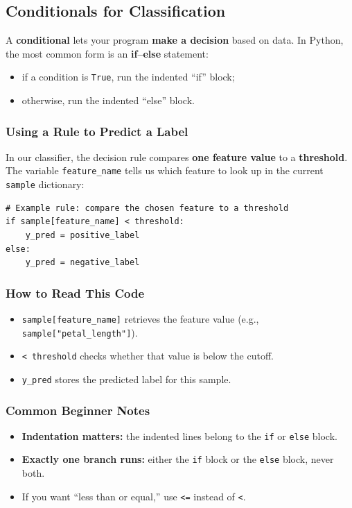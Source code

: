 \subsection{Conditionals for Classification}
\label{sec:ses3_conditionals}

A \textbf{conditional} lets your program \textbf{make a decision} based on data. In Python, the most common form is an \textbf{if--else} statement:
\begin{itemize}
  \item if a condition is \texttt{True}, run the indented ``if'' block;
  \item otherwise, run the indented ``else'' block.
\end{itemize}

\subsubsection{Using a Rule to Predict a Label}
In our classifier, the decision rule compares \textbf{one feature value} to a \textbf{threshold}. The variable \texttt{feature\_name} tells us which feature to look up in the current \texttt{sample} dictionary:

\begin{verbatim}
# Example rule: compare the chosen feature to a threshold
if sample[feature_name] < threshold:
    y_pred = positive_label
else:
    y_pred = negative_label
\end{verbatim}

\subsubsection{How to Read This Code}
\begin{itemize}
  \item \texttt{sample[feature\_name]} retrieves the feature value (e.g., \texttt{sample["petal\_length"]}).
  \item \texttt{< threshold} checks whether that value is below the cutoff.
  \item \texttt{y\_pred} stores the predicted label for this sample.
\end{itemize}

\subsubsection{Common Beginner Notes}
\begin{itemize}
  \item \textbf{Indentation matters:} the indented lines belong to the \texttt{if} or \texttt{else} block.
  \item \textbf{Exactly one branch runs:} either the \texttt{if} block or the \texttt{else} block, never both.
  \item If you want ``less than or equal,'' use \texttt{<=} instead of \texttt{<}.
\end{itemize}




